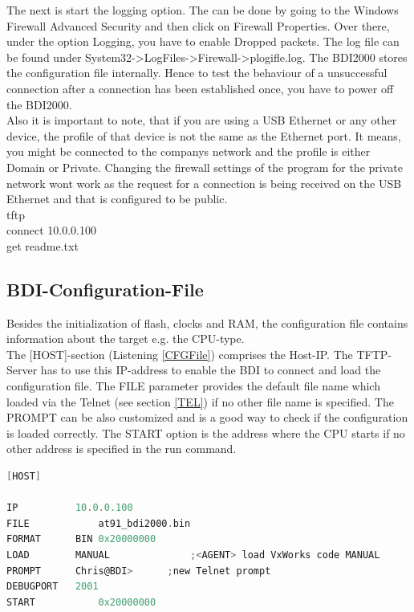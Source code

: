 The next is start the logging option. The can be done by going to the Windows Firewall Advanced Security and then click on Firewall Properties. Over there, under the option Logging, you have to enable Dropped packets. The log file can be found under System32->LogFiles->Firewall->plogifle.log. The BDI2000 stores the configuration file internally. Hence to test the behaviour of a unsuccessful connection after a connection has been established once, you have to power off the BDI2000.\\
Also it is important to note, that if you are using a USB Ethernet or any other device, the profile of that device is not the same as the Ethernet port. It means, you might be connected to the companys network and the profile is either Domain or Private. Changing the firewall settings of the program for the private network wont work as the request for a connection is being received on the USB Ethernet and that is configured to be public.\\

tftp\\
connect 10.0.0.100\\
get readme.txt\\


\subsection{BDI-Configuration-File}
Besides the initialization of flash, clocks and \ac{RAM}, the configuration file contains information about the target e.g. the \ac{CPU}-type.\\
The [HOST]-section (Listening \ref{CFGFile}) comprises the Host-IP. The \ac{TFTP}-Server has to use this IP-address to enable the BDI to connect and load the configuration file. The FILE parameter provides the default file name which loaded via the Telnet (see section \ref{TEL}) if no other file name is specified. The PROMPT can be also customized and is a good way to check if the configuration is loaded correctly. The START option is the address where the \ac{CPU} starts if no other address is specified in the run command.\\
\begin{lstlisting}[language=C, caption={Extract of the rm9200dk.cfg-file}, label={CFGFile}]
[HOST]

IP          10.0.0.100
FILE	    	at91_bdi2000.bin	
FORMAT	    BIN 0x20000000
LOAD        MANUAL      		;<AGENT> load VxWorks code MANUAL
PROMPT      Chris@BDI>      ;new Telnet prompt
DEBUGPORT   2001
START	    	0x20000000
\end{lstlisting}

